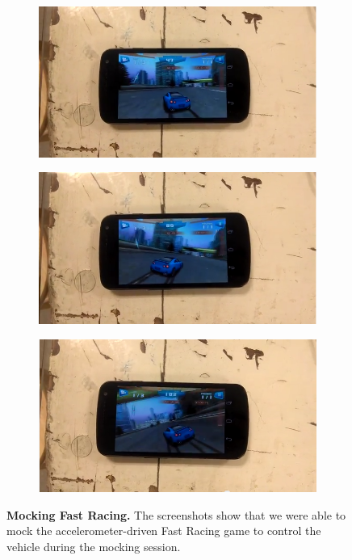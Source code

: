 \begin{figure}[t]

\begin{subfigure}[t]{0.33\textwidth}
\includegraphics[width=\textwidth]{./figures/apps/fast_racing/fastracing1.png}
\caption{}
\end{subfigure}%
\begin{subfigure}[t]{0.33\textwidth}
\includegraphics[width=\textwidth]{./figures/apps/fast_racing/fastracing2.png}
\caption{}
\end{subfigure}%
\begin{subfigure}[t]{0.33\textwidth}
\includegraphics[width=\textwidth]{./figures/apps/fast_racing/fastracing3.png}
\caption{}
\end{subfigure}

\caption{\textbf{Mocking Fast Racing.} The screenshots show that we were able
  to mock the accelerometer-driven Fast Racing game to control the vehicle
during the mocking session.}

\label{fig-mocking-game}

\end{figure}

